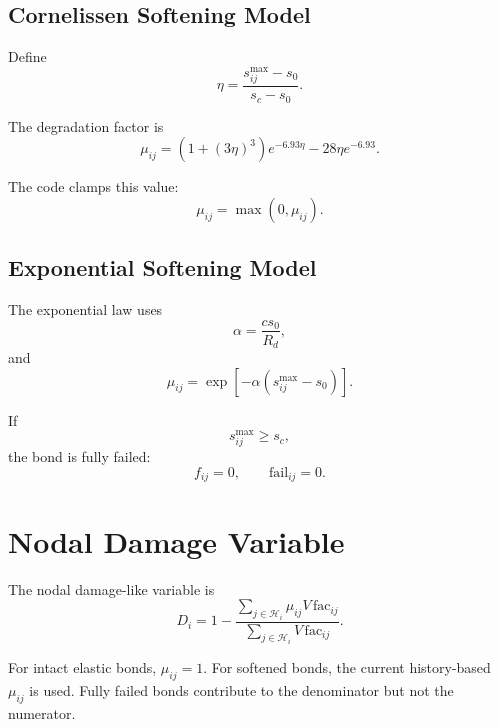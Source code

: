 \documentclass[11pt]{article}
\begin{document}
\subsection{Cornelissen Softening Model}

Define
\begin{equation}
    \eta =
    \frac{s_{ij}^{\max}-s_0}{s_c-s_0}.
\end{equation}

The degradation factor is
\begin{equation}
    \mu_{ij}
    =
    \left(1+(3\eta)^3\right)e^{-6.93\eta}
    -
    28\eta e^{-6.93}.
\end{equation}

The code clamps this value:
\begin{equation}
    \mu_{ij}
    =
    \max(0,\mu_{ij}).
\end{equation}

\subsection{Exponential Softening Model}

The exponential law uses
\begin{equation}
    \alpha =
    \frac{cs_0}{R_d},
\end{equation}
and
\begin{equation}
    \mu_{ij}
    =
    \exp\left[
        -\alpha
        \left(s_{ij}^{\max}-s_0\right)
    \right].
\end{equation}

If
\begin{equation}
    s_{ij}^{\max}\ge s_c,
\end{equation}
the bond is fully failed:
\begin{equation}
    f_{ij}=0,
    \qquad
    \mathrm{fail}_{ij}=0 .
\end{equation}

\section{Nodal Damage Variable}

The nodal damage-like variable is
\begin{equation}
    D_i
    =
    1
    -
    \frac{
        \sum_{j\in\mathcal{H}_i}
        \mu_{ij}V\,\mathrm{fac}_{ij}
    }{
        \sum_{j\in\mathcal{H}_i}
        V\,\mathrm{fac}_{ij}
    }.
\end{equation}

For intact elastic bonds, \(\mu_{ij}=1\). For softened bonds, the current
history-based \(\mu_{ij}\) is used. Fully failed bonds contribute to the
denominator but not the numerator.
\end{document}
